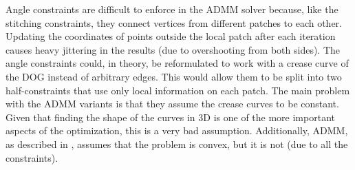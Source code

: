 \documentclass[a4paper,twoside,12pt,nochapterprefix]{scrbook}
\begin{document}
Angle constraints are difficult to enforce in the ADMM solver because, like the stitching constraints, they connect vertices from different patches to each other. Updating the coordinates of points outside the local patch after each iteration causes heavy jittering in the results (due to overshooting from both sides). The angle constraints could, in theory, be reformulated to work with a crease curve of the DOG instead of arbitrary edges. This would allow them to be split into two half-constraints that use only local information on each patch.\newline
The main problem with the ADMM variants is that they assume the crease curves to be constant. Given that finding the shape of the curves in 3D is one of the more important aspects of the optimization, this is a very bad assumption. Additionally, ADMM, as described in \cite{Deng2017ParallelMA}, assumes that the problem  is convex, but it is not (due to all the constraints).\newline

\end{document}

